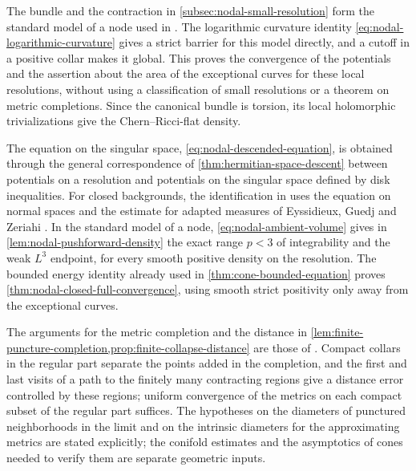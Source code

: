 The bundle and the contraction in \cref{subsec:nodal-small-resolution} form the standard model of a node used in \cite[v1, Equation~(2.1), p.~4, and Section~4, pp.~15--16]{GM26}. The logarithmic curvature identity \eqref{eq:nodal-logarithmic-curvature} gives a strict barrier for this model directly, and a cutoff in a positive collar makes it global. This proves the convergence of the potentials and the assertion about the area of the exceptional curves for these local resolutions, without using a classification of small resolutions or a theorem on metric completions. Since the canonical bundle is torsion, its local holomorphic trivializations give the Chern--Ricci-flat density.

The equation on the singular space, \eqref{eq:nodal-descended-equation}, is obtained through the general correspondence of \cref{thm:hermitian-space-descent} between potentials on a resolution and potentials on the singular space defined by disk inequalities. For closed backgrounds, the identification in \cite[v1, Lemma~3.1 and the proof of Corollary~1.1, pp.~13--14]{GM26} uses the equation on normal spaces and the estimate for adapted measures of Eyssidieux, Guedj and Zeriahi \cite[Theorem~6.3 and Lemma~6.4, pp.~632--634]{EGZ09}. In the standard model of a node, \eqref{eq:nodal-ambient-volume} gives in \cref{lem:nodal-pushforward-density} the exact range $p<3$ of integrability and the weak $L^3$ endpoint, for every smooth positive density on the resolution. The bounded energy identity already used in \cref{thm:cone-bounded-equation} proves \cref{thm:nodal-closed-full-convergence}, using smooth strict positivity only away from the exceptional curves.

The arguments for the metric completion and the distance in \cref{lem:finite-puncture-completion,prop:finite-collapse-distance} are those of \cite[v1, Lemma~5.2, pp.~23--24, and Proposition~5.1, pp.~24--26]{GM26}. Compact collars in the regular part separate the points added in the completion, and the first and last visits of a path to the finitely many contracting regions give a distance error controlled by these regions; uniform convergence of the metrics on each compact subset of the regular part suffices. The hypotheses on the diameters of punctured neighborhoods in the limit and on the intrinsic diameters for the approximating metrics are stated explicitly; the conifold estimates and the asymptotics of cones needed to verify them are separate geometric inputs.

